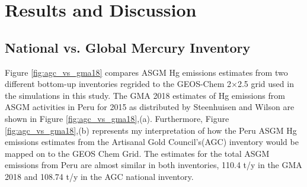 \newpage
\section{Results and Discussion}
\subsection{National vs. Global Mercury Inventory}
Figure \ref{fig:agc_vs_gma18} compares ASGM Hg emissions estimates from two different bottom-up inventories regrided to the GEOS-Chem 2$\times$2.5 grid used in the simulations in this study. The GMA 2018  estimates of Hg emissions from ASGM activities in Peru for 2015 as distributed by Steenhuisen and Wilson\cite{steenhuisen_development_2019} are shown in Figure \ref{fig:agc_vs_gma18},(a). Furthermore, Figure \ref{fig:agc_vs_gma18},(b) represents my interpretation of how the Peru ASGM Hg emissions estimates from the Artisanal Gold Council's(AGC) inventory\cite{agc_reporte_2017} would be mapped on to the GEOS Chem Grid. The estimates for the total ASGM emissions from Peru are almost similar in both inventories, 110.4 t/y in the GMA 2018 and 108.74 t/y in the AGC national inventory.





